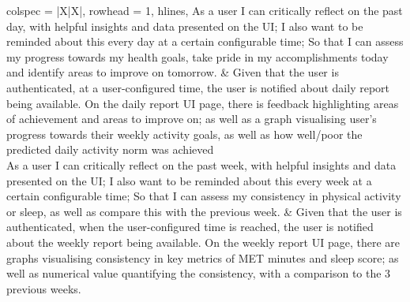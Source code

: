 \begin{center}
\begin{longtblr}[
            caption={User Stories},
            label={table:userStories}
        ] {
            colspec = {|X|X|},
            rowhead = 1,
            hlines,
        }
        As a user I can critically reflect on the past day, with helpful insights and data presented on the UI; I also want to be reminded about this every day at a certain configurable time; So that I can assess my progress towards my health goals, take pride in my accomplishments today and identify areas to improve on tomorrow.
        & 
        Given that the user is authenticated, at a user-configured time, the user is notified about daily report being available. On the daily report UI page, there is feedback highlighting areas of achievement and areas to improve on; as well as a graph visualising user's progress towards their weekly activity goals, as well as how well/poor the predicted daily activity norm was achieved
        \\

        As a user I can critically reflect on the past week, with helpful insights and data presented on the UI; I also want to be reminded about this every week at a certain configurable time; So that I can assess my consistency in physical activity or sleep, as well as compare this with the previous week.
        &
        Given that the user is authenticated, when the user-configured time is reached, the user is notified about the weekly report being available. On the weekly report UI page, there are graphs visualising consistency in key metrics of MET minutes and sleep score; as well as numerical value quantifying the consistency, with a comparison to the 3 previous weeks. 
       \\


\end{longtblr}
\end{center}
